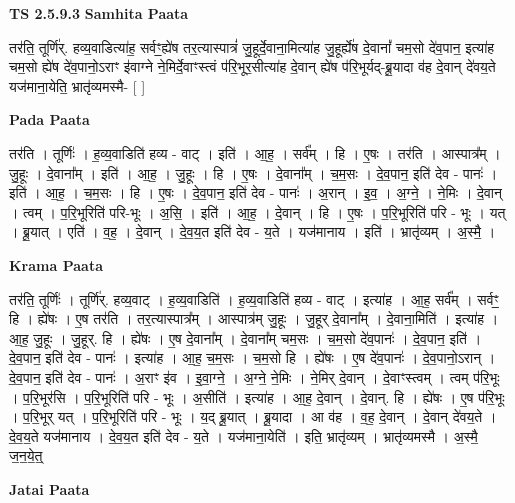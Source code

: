 \documentclass[17pt]{extarticle}
\begin{document}
\textbf{TS 2.5.9.3 } \newline
\textbf{Samhita Paata} \newline

तर॑ति॒ तूर्णि॑र्. हव्य॒वाडित्या॑ह॒ सर्वꣳ॒॒ह्ये॑ष तर॒त्यास्पात्रं॑ जु॒हूर्दे॒वाना॒मित्या॑ह जु॒हूर्ह्ये॑ष दे॒वानां᳚ चम॒सो दे॑व॒पान॒ इत्या॑ह चम॒सो ह्ये॑ष दे॑व॒पानो॒ऽराꣳ इ॑वाग्ने ने॒मिर्दे॒वाꣳस्त्वं प॑रि॒भूर॒सीत्या॑ह दे॒वान् ह्ये॑ष प॑रि॒भूर्यद्-ब्रू॒यादा व॑ह दे॒वान् दे॑वय॒ते यज॑माना॒येति॒ भ्रातृ॑व्यमस्मै- [  ] \newline

\textbf{Pada Paata} \newline

तर॑ति । तूर्णिः॑ । ह॒व्य॒वाडिति॑ हव्य - वाट् । इति॑ । आ॒ह॒ । सर्व᳚म् । हि । ए॒षः । तर॑ति । आस्पात्र᳚म् । जु॒हूः । दे॒वाना᳚म् । इति॑ । आ॒ह॒ । जु॒हूः । हि । ए॒षः । दे॒वाना᳚म् । च॒म॒सः । दे॒व॒पान॒ इति॑ देव - पानः॑ । इति॑ । आ॒ह॒ । च॒म॒सः । हि । ए॒षः । दे॒व॒पान॒ इति॑ देव - पानः॑ । अ॒रान् । इ॒व॒ । अ॒ग्ने॒ । ने॒मिः । दे॒वान् । त्वम् । प॒रि॒भूरिति॑ परि-भूः । अ॒सि॒ । इति॑ । आ॒ह॒ । दे॒वान् । हि । ए॒षः । प॒रि॒भूरिति॑ परि - भूः । यत् । ब्रू॒यात् । एति॑ । व॒ह॒ । दे॒वान् । दे॒व॒य॒त इति॑ देव - य॒ते । यज॑मानाय । इति॑ । भ्रातृ॑व्यम् । अ॒स्मै॒ ।  \newline


\textbf{Krama Paata} \newline

तर॑ति॒ तूर्णिः॑ । तूर्णि॑र्. हव्य॒वाट् । ह॒व्य॒वाडिति॑ । ह॒व्य॒वाडिति॑ हव्य - वाट् । इत्या॑ह । आ॒ह॒ सर्व᳚म् । सर्वꣳ॒॒ हि । ह्ये॑षः । ए॒ष तर॑ति । तर॒त्यास्पात्र᳚म् । आस्पात्र॑म् जु॒हूः । जु॒हूर् दे॒वाना᳚म् । दे॒वाना॒मिति॑ । इत्या॑ह । आ॒ह॒ जु॒हूः । जु॒हूर्. हि । ह्ये॑षः । ए॒ष दे॒वाना᳚म् । दे॒वाना᳚म् चम॒सः । च॒म॒सो दे॑व॒पानः॑ । दे॒व॒पान॒ इति॑ । दे॒व॒पान॒ इति॑ देव - पानः॑ । इत्या॑ह । आ॒ह॒ च॒म॒सः । च॒म॒सो हि । ह्ये॑षः । ए॒ष दे॑व॒पानः॑ । दे॒व॒पानो॒ऽरान् । दे॒व॒पान॒ इति॑ देव - पानः॑ । अ॒राꣳ इ॑व । इ॒वा॒ग्ने॒ । अ॒ग्ने॒ ने॒मिः । ने॒मिर् दे॒वान् । दे॒वाꣳस्त्वम् । त्वम् प॑रि॒भूः । प॒रि॒भूर॑सि । प॒रि॒भूरिति॑ परि - भूः । अ॒सीति॑ । इत्या॑ह । आ॒ह॒ दे॒वान् । दे॒वान्. हि । ह्ये॑षः । ए॒ष प॑रि॒भूः । प॒रि॒भूर् यत् । प॒रि॒भूरिति॑ परि - भूः । य॒द् ब्रू॒यात् । ब्रू॒यादा । आ व॑ह । व॒ह॒ दे॒वान् । दे॒वान् दे॑वय॒ते । दे॒व॒य॒ते यज॑मानाय । दे॒व॒य॒त इति॑ देव - य॒ते । यज॑माना॒येति॑ । इति॒ भ्रातृ॑व्यम् । भ्रातृ॑व्यमस्मै । अ॒स्मै॒ ज॒न॒ये॒त्॒ \newline

\textbf{Jatai Paata} \newline
\end{document}
